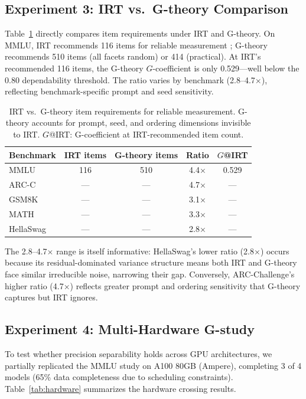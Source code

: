 \documentclass[11pt,letterpaper]{article}
\begin{document}
\subsection{Experiment 3: IRT vs.\ G-theory Comparison}

Table~\ref{tab:irt_comparison} directly compares item requirements under IRT and G-theory. On MMLU, IRT recommends 116 items for reliable measurement \citep{polo2024tinybenchmarks}; G-theory recommends 510 items (all facets random) or 414 (practical). At IRT's recommended 116 items, the G-theory $G$-coefficient is only 0.529---well below the 0.80 dependability threshold. The ratio varies by benchmark (2.8--4.7$\times$), reflecting benchmark-specific prompt and seed sensitivity.

\begin{table}[t]
\centering
\caption{IRT vs.\ G-theory item requirements for reliable measurement. G-theory accounts for prompt, seed, and ordering dimensions invisible to IRT. $G$@IRT: G-coefficient at IRT-recommended item count.}
\label{tab:irt_comparison}
\small
\begin{tabular}{lcccc}
\toprule
\textbf{Benchmark} & \textbf{IRT items} & \textbf{G-theory items} & \textbf{Ratio} & \textbf{$G$@IRT} \\
\midrule
MMLU      & 116 & 510 & 4.4$\times$ & 0.529 \\
ARC-C     & --- & --- & 4.7$\times$ & --- \\
GSM8K     & --- & --- & 3.1$\times$ & --- \\
MATH      & --- & --- & 3.3$\times$ & --- \\
HellaSwag & --- & --- & 2.8$\times$ & --- \\
\bottomrule
\end{tabular}
\end{table}

The 2.8--4.7$\times$ range is itself informative: HellaSwag's lower ratio (2.8$\times$) occurs because its residual-dominated variance structure means both IRT and G-theory face similar irreducible noise, narrowing their gap. Conversely, ARC-Challenge's higher ratio (4.7$\times$) reflects greater prompt and ordering sensitivity that G-theory captures but IRT ignores.

\subsection{Experiment 4: Multi-Hardware G-study}

To test whether precision separability holds across GPU architectures, we partially replicated the MMLU study on A100 80GB (Ampere), completing 3 of 4 models (65\% data completeness due to scheduling constraints). Table~\ref{tab:hardware} summarizes the hardware crossing results.
\end{document}
